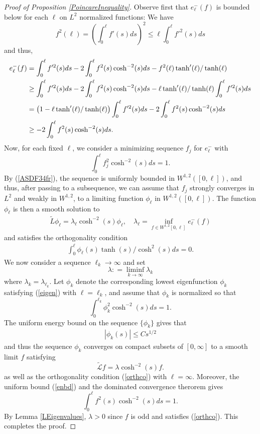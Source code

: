 \documentclass{amsart}
\newcommand{\mc}{\mathcal}
\newcommand{\wt}{\widetilde}
\begin{document}
\begin{proof}[Proof of Proposition \ref{PoincareInequality}]
Observe first that  $e^{-}_\ell(f)$ is bounded below for each $\ell$ on $L^2$ normalized functions: We have
\[
f^2(\ell) = \left( \int_{0}^\ell f'(s) ds\right)^2 \leq \ell \int_{0}^\ell f'^2(s) ds
\]
and thus, 
\begin{align}\label{ASDF34fr}
e^{-}_\ell(f) & = \int_0^\ell f'^2 (s) ds - 2 \int_0^\ell f^2(s) \cosh^{-2} (s) ds - f^2 (\ell) \tanh'(\ell)/\tanh(\ell) \\ \notag
& \geq \int_0^\ell f'^2 (s) ds - 2 \int_0^\ell f^2(s) \cosh^{-2} (s) ds - \ell \tanh'(\ell)/\tanh(\ell) \int_0^\ell f'^2 (s) ds \\ \notag
& = \left (1 -  \ell \tanh'(\ell)/\tanh(\ell) \right) \int_{0}^\ell f'^2(s) ds- 2 \int_0^\ell f^2(s) \cosh^{-2} (s) ds  \\ \notag
& \geq - 2 \int_0^\ell f^2(s) \cosh^{-2} (s) ds .
\end{align}
Now, for  each fixed $\ell$, we consider a minimizing sequence $f_j$ for $e^{-}_\ell$ with
\[
\int_0^\ell f^2_j \cosh^{-2} (s) ds = 1.
\]
 By  (\ref{ASDF34fr}), the sequence is uniformly bounded in $W^{1, 2}\left([0, \ell]\right)$, and thus, after passing to a subsequence, we can assume that $f_j$  strongly  converges in $L^2$ and weakly in $W^{1, 2}$,  to a limiting function $\phi_{\ell}$ in $W^{1, 2}([0, \ell])$. The function $\phi_\ell$ is then  a smooth solution to
 \begin{align}\label{eigen}
 \wt{L} \phi_\ell= \lambda_{\ell} \cosh^{-2}(s)\phi_{\ell}, \quad \lambda_{\ell} = \inf_{f \in W^{1, 2}[0, \ell]} e^{-}_\ell(f)
 \end{align} 
and  satisfies the orthogonality condition 
\begin{align}\label{orthco}
\int_{0}^\ell \phi_{\ell}(s) \tanh(s)/\cosh^{2}(s) ds = 0.
\end{align}
 We now consider a sequence $\ell_k \rightarrow \infty$ and  set 
 \[
 \lambda : = \liminf_{k \rightarrow \infty} \lambda_{k}
 \]
 where $\lambda_{k} = \lambda_{\ell_k}$. Let $\phi_k$ denote the corresponding lowest eigenfunction $\phi_k$ satisfying  (\ref{eigen}) with $\ell  = \ell_k$, and assume that $\phi_k$ is normalized so that 
 \[
 \int_{0}^{\ell_k} \phi^2_{k}\cosh^{-2}(s) ds = 1. 
 \]
   The uniform energy bound on the sequence $\{ \phi_k\}$ gives that 
\begin{align} \label{enbd}
|\phi_k (s)| \leq C s^{1/2}
\end{align}
and thus the sequence $\phi_k$ converges on compact subsets of $[0, \infty]$ to a smooth limit $f$ satisfying
\[
\wt{\mc{L}} f = \lambda \cosh^{-2}(s) f.
\]
as well as the orthogonality condition (\ref{orthco}) with $\ell = \infty$. Moreover, the uniform  bound (\ref{enbd}) and the dominated convergence therorem gives
\[
\int_{0}^\ell f^{2}(s) \cosh^{-2} (s) ds = 1.
\]
By Lemma \ref{LEigenvalues},  $\lambda > 0$ since $f$ is odd and satisfies  (\ref{orthco}). This completes the proof.
\end{proof}
\end{document}
